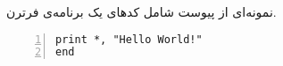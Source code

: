 
\label{python}
نمونه‌ای از پیوست شامل کدهای یک برنامه‌ی فرترن.

\begin{latin}
\lstset{language=Fortran}
\begin{lstlisting}[frame=single, basicstyle=\footnotesize, numbers=left,breaklines=true]
print *, "Hello World!"
end
\end{lstlisting}
\end{latin}
